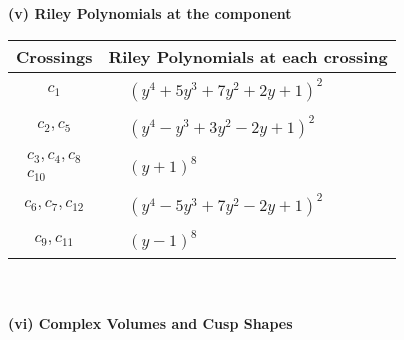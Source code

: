 \documentclass[1p]{elsarticle_modified}
\theoremstyle{definition}
\begin{document}
\newpage\renewcommand{\arraystretch}{1}
\flushleft \textbf{(v) Riley Polynomials at the component}\newline \\
\begin{tabular}{m{50pt}|m{274pt}}
Crossings & \hspace{64pt}Riley Polynomials at each crossing \\
\hline $$\begin{aligned}c_{1}\end{aligned}$$&$\begin{aligned}
&(y^4+5 y^3+7 y^2+2 y+1)^2
\end{aligned}$\\
\hline $$\begin{aligned}c_{2},c_{5}\end{aligned}$$&$\begin{aligned}
&(y^4- y^3+3 y^2-2 y+1)^2
\end{aligned}$\\
\hline $$\begin{aligned}c_{3},c_{4},c_{8}\\c_{10}\end{aligned}$$&$\begin{aligned}
&(y+1)^8
\end{aligned}$\\
\hline $$\begin{aligned}c_{6},c_{7},c_{12}\end{aligned}$$&$\begin{aligned}
&(y^4-5 y^3+7 y^2-2 y+1)^2
\end{aligned}$\\
\hline $$\begin{aligned}c_{9},c_{11}\end{aligned}$$&$\begin{aligned}
&(y-1)^8
\end{aligned}$\\
\hline
\end{tabular}\\~\\
\newpage\flushleft \textbf{(vi) Complex Volumes and Cusp Shapes}
\end{document}
